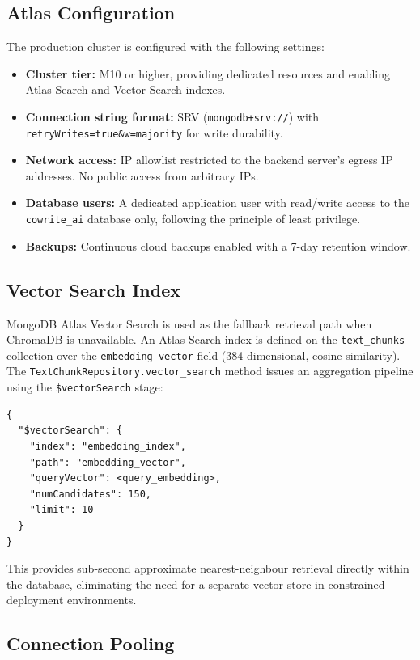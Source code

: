 \subsection{Atlas Configuration}

The production cluster is configured with the following settings:

\begin{itemize}
    \item \textbf{Cluster tier:} M10 or higher, providing dedicated resources and enabling Atlas Search and Vector Search indexes.
    \item \textbf{Connection string format:} SRV (\texttt{mongodb+srv://}) with \texttt{retryWrites=true\&w=majority} for write durability.
    \item \textbf{Network access:} IP allowlist restricted to the backend server's egress IP addresses. No public access from arbitrary IPs.
    \item \textbf{Database users:} A dedicated application user with read/write access to the \texttt{cowrite\_ai} database only, following the principle of least privilege.
    \item \textbf{Backups:} Continuous cloud backups enabled with a 7-day retention window.
\end{itemize}

\subsection{Vector Search Index}

MongoDB Atlas Vector Search is used as the fallback retrieval path when ChromaDB is unavailable. An Atlas Search index is defined on the \texttt{text\_chunks} collection over the \texttt{embedding\_vector} field (384-dimensional, cosine similarity). The \texttt{TextChunkRepository.vector\_search} method issues an aggregation pipeline using the \texttt{\$vectorSearch} stage:

\begin{verbatim}
{
  "$vectorSearch": {
    "index": "embedding_index",
    "path": "embedding_vector",
    "queryVector": <query_embedding>,
    "numCandidates": 150,
    "limit": 10
  }
}
\end{verbatim}

This provides sub-second approximate nearest-neighbour retrieval directly within the database, eliminating the need for a separate vector store in constrained deployment environments.

\subsection{Connection Pooling}

